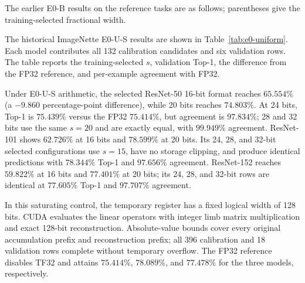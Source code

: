 \documentclass[journal]{IEEEtran}
\theoremstyle{definition}
\theoremstyle{plain}
\begin{document}
The earlier E0-B results on the reference tasks are as follows; parentheses
give the training-selected fractional width.
\begin{center}
\small
{}
\end{center}

The historical ImageNette E0-U-S results are shown in
Table~\ref{tab:e0-uniform}. Each model contributes all
132 calibration candidates and six validation rows. The table reports the
training-selected $s$, validation Top-1, the difference from the FP32
reference, and per-example agreement with FP32.

Under E0-U-S arithmetic, the selected ResNet-50 16-bit format reaches
$65.554\%$ (a $-9.860$
percentage-point difference), while 20 bits reaches $74.803\%$. At 24 bits,
Top-1 is $75.439\%$ versus the FP32 $75.414\%$, but agreement is $97.834\%$;
28 and 32 bits use the same $s=20$ and are exactly equal, with $99.949\%$
agreement. ResNet-101 shows $62.726\%$ at 16 bits and $78.599\%$ at 20 bits.
Its 24, 28, and 32-bit selected configurations use $s=15$, have no storage
clipping, and produce identical predictions with $78.344\%$ Top-1 and
$97.656\%$ agreement. ResNet-152 reaches $59.822\%$ at 16 bits and
$77.401\%$ at 20 bits; its 24, 28, and 32-bit rows are identical at
$77.605\%$ Top-1 and $97.707\%$ agreement.

In this saturating control, the temporary register has a fixed logical width
of 128 bits. CUDA evaluates
the linear operators with integer limb matrix multiplication and exact
128-bit reconstruction. Absolute-value bounds cover every original
accumulation prefix and reconstruction prefix; all 396 calibration and 18
validation rows complete without temporary overflow. The FP32 reference
disables TF32 and attains $75.414\%$, $78.089\%$, and $77.478\%$ for the
three models, respectively.
\end{document}
